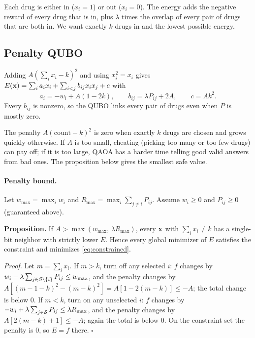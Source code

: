 \begin{plainwords}
Each drug is either in ($x_i=1$) or out ($x_i=0$). The energy adds the negative reward of every drug that is in, plus $\lambda$ times the overlap of every pair of drugs that are both in. We want exactly $k$ drugs in and the lowest possible energy.
\end{plainwords}

\subsection{Penalty QUBO}

Adding $A(\sum_i x_i-k)^2$ and using $x_i^2=x_i$ gives $E(\mathbf{x})=\sum_i a_ix_i+\sum_{i<j}b_{ij}x_ix_j+c$ with
\begin{equation}
a_i=-w_i+A(1-2k),\qquad b_{ij}=\lambda P_{ij}+2A,\qquad c=Ak^2.
\label{eq:qubo}
\end{equation}
Every $b_{ij}$ is nonzero, so the QUBO links every pair of drugs even when $P$ is mostly zero.

\begin{plainwords}
The penalty $A(\text{count}-k)^2$ is zero when exactly $k$ drugs are chosen and grows quickly otherwise. If $A$ is too small, cheating (picking too many or too few drugs) can pay off; if it is too large, QAOA has a harder time telling good valid answers from bad ones. The proposition below gives the smallest safe value.
\end{plainwords}

\paragraph{Penalty bound.} Let $w_{\max}=\max_i w_i$ and $R_{\max}=\max_i\sum_{j\ne i}P_{ij}$. Assume $w_i\ge 0$ and $P_{ij}\ge 0$ (guaranteed above).

\textbf{Proposition.} If $A>\max(w_{\max},\,\lambda R_{\max})$, every $\mathbf{x}$ with $\sum_ix_i\ne k$ has a single-bit neighbor with strictly lower $E$. Hence every global minimizer of $E$ satisfies the constraint and minimizes \eqref{eq:constrained}.

\textit{Proof.} Let $m=\sum_ix_i$. If $m>k$, turn off any selected $i$: $f$ changes by $w_i-\lambda\sum_{j\in\mathcal{S}\setminus\{i\}}P_{ij}\le w_{\max}$, and the penalty changes by $A[(m-1-k)^2-(m-k)^2]=A[1-2(m-k)]\le -A$; the total change is below $0$. If $m<k$, turn on any unselected $i$: $f$ changes by $-w_i+\lambda\sum_{j\in\mathcal{S}}P_{ij}\le\lambda R_{\max}$, and the penalty changes by $A[2(m-k)+1]\le -A$; again the total is below $0$. On the constraint set the penalty is $0$, so $E=f$ there. $\square$

